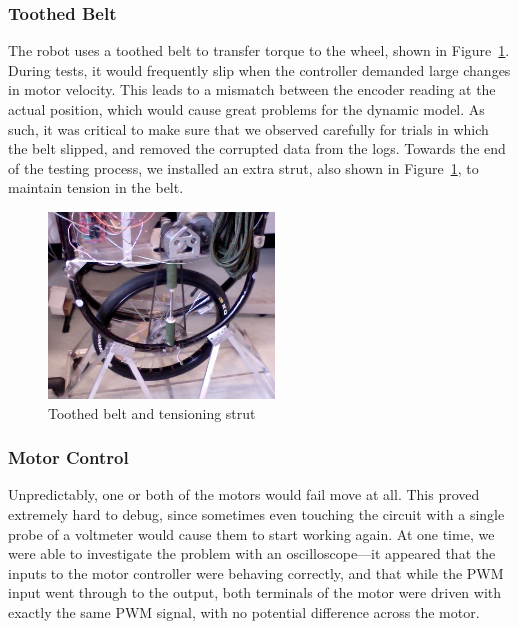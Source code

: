 \documentclass{IIBproject}
\begin{document}
\subsubsection{Toothed Belt}

The robot uses a toothed belt to transfer torque to the wheel, shown in
Figure~\ref{fig:fan_belt}. During tests, it would frequently slip when the
controller demanded large changes in motor velocity. This leads to a mismatch
between the encoder reading at the actual position, which would cause great
problems for the dynamic model. As such, it was critical to make sure that we
observed carefully for trials in which the belt slipped, and removed the
corrupted data from the logs. Towards the end of the testing process, we
installed an extra strut, also shown in Figure~\ref{fig:fan_belt}, to maintain
tension in the belt.

\begin{figure}[htpb]
  \begin{center}
    \includegraphics[width=6cm]{fan_belt.jpg}
    \end{center}
    \caption{Toothed belt and tensioning strut}
    \label{fig:fan_belt}
    \end{figure}

\subsubsection{Motor Control}

Unpredictably, one or both of the motors would fail move at all. This proved
extremely hard to debug, since sometimes even touching the circuit with a
single probe of a voltmeter would cause them to start working again. At one
time, we were able to investigate the problem with an oscilloscope---it
appeared that the inputs to the motor controller were behaving correctly, and
that while the PWM input went through to the output, both terminals of the
motor were driven with exactly the same PWM signal, with no potential
difference across the motor.
\end{document}
